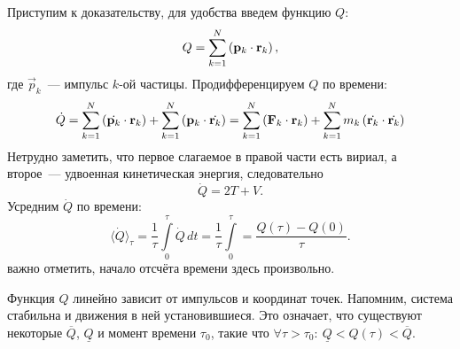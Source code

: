 Приступим к доказательству, 
для удобства введем функцию $Q$:
\begin{equation*}
    Q = \sum_{k=1}^N \left(\mathbf{p}_k \cdot \mathbf{r}_k \right),
\end{equation*}
где $\vec p_k$~--- импульс $k$-ой частицы. Продифференцируем $Q$ по времени:
\begin{equation*}
    \dot Q
    = \sum_{k=1}^N \left(\dot{\mathbf{p}_k} \cdot \mathbf{r}_k \right) 
    + \sum_{k=1}^N \left(\mathbf{p}_k \cdot \dot{\mathbf{r}_k} \right) 
    = \sum_{k=1}^N \left(\mathbf{F}_k \cdot \mathbf{r}_k \right) 
    + \sum_{k=1}^N m_k \left(\dot{\mathbf{r}_k} \cdot \dot{\mathbf{r}_k} \right)
\end{equation*}
Нетрудно заметить, что первое слагаемое в правой части есть вириал, а второе~--- удвоенная кинетическая энергия, следовательно
\begin{equation}
    \dot{Q} = 2T + V.
    \label{eq:virial-2tv}
\end{equation}
Усредним $\dot{Q}$ по времени:
\begin{equation}
    \langle \dot{Q} \rangle_\tau 
    = \frac{1}{\tau} \int\limits_0^\tau \dot{Q} \,d t 
    = \frac{1}{\tau} \int\limits_0^\tau 
    = \frac{Q(\tau) - Q(0)}{\tau}.
\label{eq:virial-avg-g}
\end{equation} 
важно отметить, начало отсчёта времени здесь произвольно.

Функция $Q$ линейно зависит от импульсов и координат точек. Напомним, система стабильна и движения в ней установившиеся. Это означает, что существуют некоторые $\overline Q$, $\underline Q$ и  момент времени $\tau_0$, такие что $\forall \tau > \tau_0:~\underline Q < Q(\tau) < \overline Q$.


